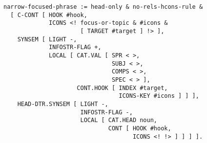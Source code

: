 \documentclass[a4paper]{article}
\begin{document}
{\small\begin{verbatim}
narrow-focused-phrase := head-only & no-rels-hcons-rule &
  [ C-CONT [ HOOK #hook,
             ICONS <! focus-or-topic & #icons &
                      [ TARGET #target ] !> ],
    SYNSEM [ LIGHT -,
             INFOSTR-FLAG +,
             LOCAL [ CAT.VAL [ SPR < >, 
                               SUBJ < >,
                               COMPS < >, 
                               SPEC < > ],
                     CONT.HOOK [ INDEX #target,
                                 ICONS-KEY #icons ] ] ],
    HEAD-DTR.SYNSEM [ LIGHT -,
                      INFOSTR-FLAG -,
                      LOCAL [ CAT.HEAD noun,
                              CONT [ HOOK #hook,
                                     ICONS <! !> ] ] ] ].
\end{verbatim}}
\end{document}
